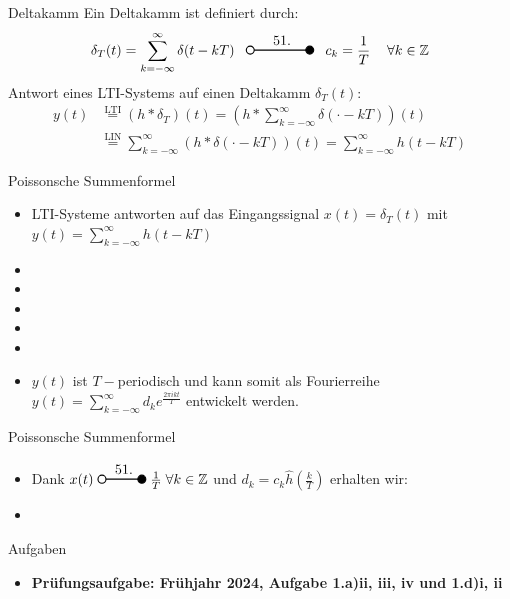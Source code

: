 \documentclass[14pt, aspectratio=169, handout]{beamer}
\newcommand{\transform}[2]{%
    \begin{tikzpicture}
        \draw[thick] (0,0) circle (0.1);
        \draw[thick] (0.1,0) -- (#2,0) node[midway, above] {#1};
        \filldraw[thick] (#2,0) circle (0.1);
    \end{tikzpicture}%
}
\begin{document}
\begin{frame}{Deltakamm}
    Ein Deltakamm ist definiert durch:
    $$\delta_T(t) = \sum_{k = -\infty}^{\infty} \delta(t-kT) \hspace{8pt} \transform{51.}{1.5} \hspace{8pt} c_k = \frac{1}{T} \hspace{12pt} \forall k \in \mathbb{Z}$$
    Antwort eines LTI-Systems auf einen Deltakamm $\delta_T(t)$:
    \begin{align*}
        y(t) &\overset{\text{LTI}}{=} (h \ast \delta_T)(t) = \left(h \ast \sum_{k = -\infty}^\infty \delta(\cdot - kT) \right)(t) \\
        &\overset{\text{LIN}}{=} \sum_{k = -\infty}^\infty \left(h \ast \delta(\cdot - kT)\right)(t) = \sum_{k = -\infty}^\infty h(t-kT)
    \end{align*}
\end{frame}

\begin{frame}{Poissonsche Summenformel}
    \begin{itemize}
        \item LTI-Systeme antworten auf das Eingangssignal $x(t) = \delta_T(t)$ mit $y(t) = \displaystyle\sum_{k = -\infty}^\infty h(t-kT)$
        \item[] 
        \item[] 
        \item[] 
        \item[] 
        \item[] 
        \item $y(t)$ ist $T-$periodisch und kann somit als Fourierreihe $y(t) = \displaystyle\sum_{k = -\infty}^\infty d_k e^{\frac{2 \pi i k t}{T}}$ entwickelt werden.
    \end{itemize}
\end{frame}

\begin{frame}{Poissonsche Summenformel}
\begin{itemize}
    \item Dank $x(t) \; \transform{51.}{1} \; \frac{1}{T} \; \forall k \in \mathbb{Z}$  und $d_k = c_k \hat{h}\left(\frac{k}{T}\right)$ erhalten wir:
    \item[] 
\end{itemize} 
%
\end{frame}

\begin{frame}{Aufgaben}
    \begin{itemize}
        \item \textbf{Prüfungsaufgabe: Frühjahr 2024, Aufgabe 1.a)ii, iii, iv und 1.d)i, ii}
    \end{itemize}
\end{frame}
\end{document}
